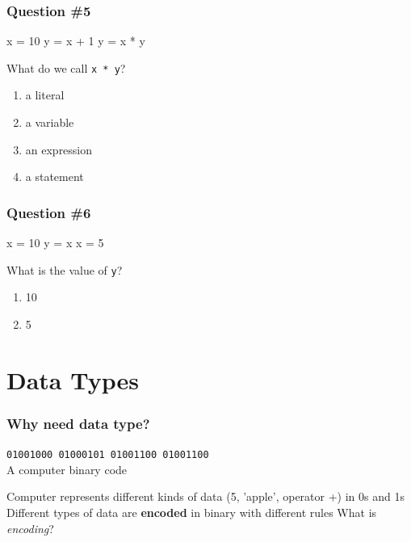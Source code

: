 \documentclass[11pt]{beamer}
\begin{document}
\begin{frame}[fragile]
  \frametitle{Question \#5}
  \Enlarge

  \begin{semiverbatim}
x = 10
y = x + 1
y = x * y
  \end{semiverbatim}
  What do we call \texttt{x * y}?
  \begin{enumerate}[label=\Alph*]
  \item  a literal
  \item  a variable
  \item  an expression
  \item  a statement
  \end{enumerate}
\end{frame}

\begin{frame}[fragile]
  \frametitle{Question \#6}
  \Enlarge

  \begin{semiverbatim}
x = 10
y = x
x = 5
  \end{semiverbatim}
  What is the value of \texttt{y}?
  \begin{enumerate}[label=\Alph*]
  \item  10
  \item  5
  \end{enumerate}
\end{frame}

\section{Data Types}

\begin{frame}
  \frametitle{Why need data type?}
  \Enlarge

  \texttt{01001000 01000101 01001100 01001100} \\
  A computer binary code
  \begin{itemize}
  \myitem  Computer represents different kinds of data (5, 'apple', operator +) in 0s and 1s\pause
  \myitem  Different types of data are {\bf encoded} in binary with different rules \pause
  \myitem What is \emph{encoding}?
  \end{itemize}
\end{frame}
\end{document}
